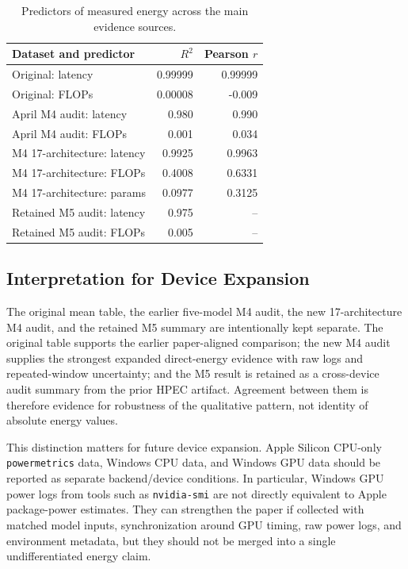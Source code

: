 \documentclass[conference]{IEEEtran}
\begin{document}
\begin{table}[t]
\centering
\caption{Predictors of measured energy across the main evidence sources.}
\label{tab:predictors}
\begin{tabular}{lrr}
\toprule
Dataset and predictor & $R^2$ & Pearson $r$ \\
\midrule
Original: latency & 0.99999 & 0.99999 \\
Original: FLOPs & 0.00008 & -0.009 \\
April M4 audit: latency & 0.980 & 0.990 \\
April M4 audit: FLOPs & 0.001 & 0.034 \\
M4 17-architecture: latency & 0.9925 & 0.9963 \\
M4 17-architecture: FLOPs & 0.4008 & 0.6331 \\
M4 17-architecture: params & 0.0977 & 0.3125 \\
Retained M5 audit: latency & 0.975 & -- \\
Retained M5 audit: FLOPs & 0.005 & -- \\
\bottomrule
\end{tabular}
\end{table}

\subsection{Interpretation for Device Expansion}

The original mean table, the earlier five-model M4 audit, the new
17-architecture M4 audit, and the retained M5 summary are intentionally kept
separate. The original table supports the earlier paper-aligned comparison;
the new M4 audit supplies the strongest expanded direct-energy evidence with
raw logs and repeated-window uncertainty; and the M5 result is retained as a
cross-device audit summary from the prior HPEC artifact. Agreement between
them is therefore evidence for robustness of the qualitative pattern, not
identity of absolute energy values.

This distinction matters for future device expansion. Apple Silicon CPU-only
\texttt{powermetrics} data, Windows CPU data, and Windows GPU data should be
reported as separate backend/device conditions. In particular, Windows GPU
power logs from tools such as \texttt{nvidia-smi} are not directly equivalent
to Apple package-power estimates. They can strengthen the paper if collected
with matched model inputs, synchronization around GPU timing, raw power logs,
and environment metadata, but they should not be merged into a single
undifferentiated energy claim.
\end{document}
